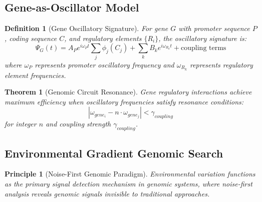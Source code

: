 \documentclass[12pt,a4paper]{article}
\newtheorem{theorem}{Theorem}
\newtheorem{definition}{Definition}
\newtheorem{principle}{Principle}
\begin{document}
\subsection{Gene-as-Oscillator Model}

\begin{definition}[Gene Oscillatory Signature]
For gene $G$ with promoter sequence $P$, coding sequence $C$, and regulatory elements $\{R_i\}$, the oscillatory signature is:
\begin{equation}
\Psi_G(t) = A_P e^{i\omega_P t} \sum_{j} \phi_j(C_j) + \sum_k B_k e^{i\omega_{R_k} t} + \text{coupling terms}
\end{equation}
where $\omega_P$ represents promoter oscillatory frequency and $\omega_{R_k}$ represents regulatory element frequencies.
\end{definition}

\begin{theorem}[Genomic Circuit Resonance]
Gene regulatory interactions achieve maximum efficiency when oscillatory frequencies satisfy resonance conditions:
\begin{equation}
|\omega_{gene_i} - n \cdot \omega_{gene_j}| < \gamma_{coupling}
\end{equation}
for integer $n$ and coupling strength $\gamma_{coupling}$.
\end{theorem}

\subsection{Environmental Gradient Genomic Search}

\begin{principle}[Noise-First Genomic Paradigm]
Environmental variation functions as the primary signal detection mechanism in genomic systems, where noise-first analysis reveals genomic signals invisible to traditional approaches.
\end{principle}
\end{document}
